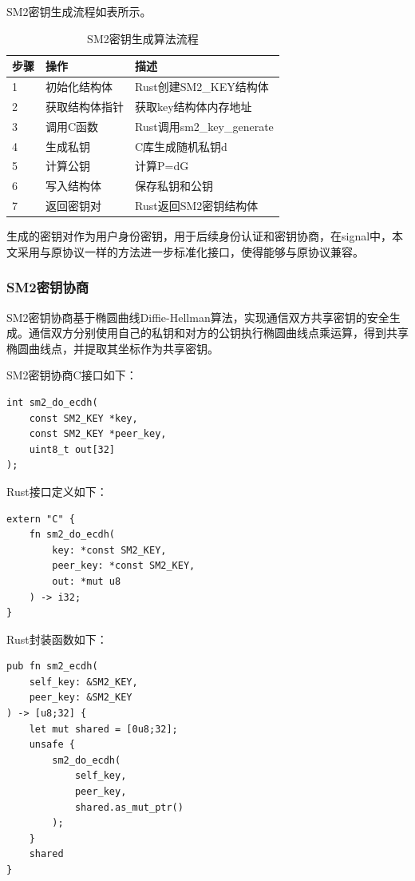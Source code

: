 SM2密钥生成流程如表所示。

\begin{table}[H]
\centering
\caption{SM2密钥生成算法流程}
\begin{tabular}{lll}
\toprule
步骤 & 操作 & 描述 \\
\midrule
1 & 初始化结构体 & Rust创建SM2\_KEY结构体 \\
2 & 获取结构体指针 & 获取key结构体内存地址 \\
3 & 调用C函数 & Rust调用sm2\_key\_generate \\
4 & 生成私钥 & C库生成随机私钥d \\
5 & 计算公钥 & 计算P=dG \\
6 & 写入结构体 & 保存私钥和公钥 \\
7 & 返回密钥对 & Rust返回SM2密钥结构体 \\
\bottomrule
\end{tabular}
\end{table}

生成的密钥对作为用户身份密钥，用于后续身份认证和密钥协商，在signal中，本文采用与原协议一样的方法进一步标准化接口，使得能够与原协议兼容。

\subsubsection{SM2密钥协商}

SM2密钥协商基于椭圆曲线Diffie-Hellman算法，实现通信双方共享密钥的安全生成。通信双方分别使用自己的私钥和对方的公钥执行椭圆曲线点乘运算，得到共享椭圆曲线点，并提取其坐标作为共享密钥。

SM2密钥协商C接口如下：

\begin{lstlisting}
int sm2_do_ecdh(
    const SM2_KEY *key,
    const SM2_KEY *peer_key,
    uint8_t out[32]
);
\end{lstlisting}

Rust接口定义如下：

\begin{lstlisting}
extern "C" {
    fn sm2_do_ecdh(
        key: *const SM2_KEY,
        peer_key: *const SM2_KEY,
        out: *mut u8
    ) -> i32;
}
\end{lstlisting}

Rust封装函数如下：

\begin{lstlisting}
pub fn sm2_ecdh(
    self_key: &SM2_KEY,
    peer_key: &SM2_KEY
) -> [u8;32] {
    let mut shared = [0u8;32];
    unsafe {
        sm2_do_ecdh(
            self_key,
            peer_key,
            shared.as_mut_ptr()
        );
    }
    shared
}
\end{lstlisting}

